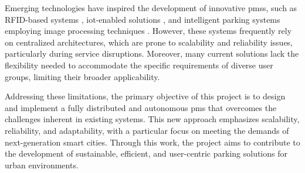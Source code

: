 Emerging technologies have inspired the development of innovative \glspl{pms}, such as RFID-based systems \autocite{rfid_smart_parking_management_system}, \gls{iot}-enabled solutions \autocite{development_smart_parking_management_system}, and intelligent parking systems employing image processing techniques \autocite{intelligent_parking_system_image_processing}. However, these systems frequently rely on centralized architectures, which are prone to scalability and reliability issues, particularly during service disruptions. Moreover, many current solutions lack the flexibility needed to accommodate the specific requirements of diverse user groups, limiting their broader applicability.

Addressing these limitations, the primary objective of this project is to design and implement a fully distributed and autonomous \gls{pms} that overcomes the challenges inherent in existing systems. This new approach emphasizes scalability, reliability, and adaptability, with a particular focus on meeting the demands of next-generation smart cities. Through this work, the project aims to contribute to the development of sustainable, efficient, and user-centric parking solutions for urban environments.

